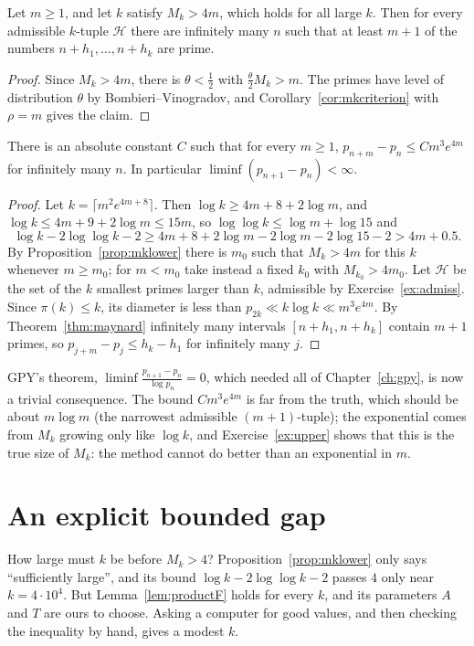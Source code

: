 \begin{theorem}[Maynard, 2013]\label{thm:maynard}
Let $m\ge1$, and let $k$ satisfy $M_k>4m$, which holds for all large $k$. Then for every admissible $k$-tuple $\mathcal H$ there are infinitely many $n$ such that at least $m+1$ of the numbers $n+h_1,\dots,n+h_k$ are prime.
\end{theorem}
\begin{proof}
Since $M_k>4m$, there is $\theta<\frac12$ with $\frac\theta2M_k>m$. The primes have level of distribution $\theta$ by Bombieri--Vinogradov, and Corollary~\ref{cor:mkcriterion} with $\rho=m$ gives the claim.
\end{proof}

\begin{corollary}\label{cor:mprimes}
There is an absolute constant $C$ such that for every $m\ge1$, $p_{n+m}-p_n\le Cm^3e^{4m}$ for infinitely many $n$. In particular $\liminf(p_{n+1}-p_n)<\infty$.
\end{corollary}
\begin{proof}
Let $k=\lceil m^2e^{4m+8}\rceil$. Then $\log k\ge4m+8+2\log m$, and $\log k\le4m+9+2\log m\le15m$, so $\log\log k\le\log m+\log15$ and
\[
\log k-2\log\log k-2\ge4m+8+2\log m-2\log m-2\log15-2>4m+0.5.
\]
By Proposition~\ref{prop:mklower} there is $m_0$ such that $M_k>4m$ for this $k$ whenever $m\ge m_0$; for $m<m_0$ take instead a fixed $k_0$ with $M_{k_0}>4m_0$. Let $\mathcal H$ be the set of the $k$ smallest primes larger than $k$, admissible by Exercise~\ref{ex:admiss}. Since $\pi(k)\le k$, its diameter is less than $p_{2k}\ll k\log k\ll m^3e^{4m}$. By Theorem~\ref{thm:maynard} infinitely many intervals $[n+h_1,n+h_k]$ contain $m+1$ primes, so $p_{j+m}-p_j\le h_k-h_1$ for infinitely many $j$.
\end{proof}

GPY's theorem, $\liminf\frac{p_{n+1}-p_n}{\log p_n}=0$, which needed all of Chapter~\ref{ch:gpy}, is now a trivial consequence. The bound $Cm^3e^{4m}$ is far from the truth, which should be about $m\log m$ (the narrowest admissible $(m+1)$-tuple); the exponential comes from $M_k$ growing only like $\log k$, and Exercise~\ref{ex:upper} shows that this is the true size of $M_k$: the method cannot do better than an exponential in $m$.

\section{An explicit bounded gap}

How large must $k$ be before $M_k>4$? Proposition~\ref{prop:mklower} only says ``sufficiently large'', and its bound $\log k-2\log\log k-2$ passes $4$ only near $k=4\cdot10^4$. But Lemma~\ref{lem:productF} holds for every $k$, and its parameters $A$ and $T$ are ours to choose. Asking a computer for good values, and then checking the inequality by hand, gives a modest $k$.

